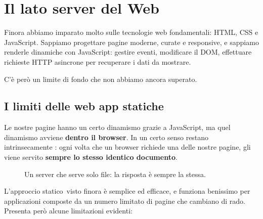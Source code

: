 \chapter{Il lato server del Web}

Finora abbiamo imparato molto sulle tecnologie web fondamentali: HTML, CSS e
JavaScript. Sappiamo progettare pagine moderne, curate e responsive, e sappiamo
renderle dinamiche con JavaScript: gestire eventi, modificare il DOM, effettuare
richieste HTTP asincrone per recuperare i dati da mostrare.

C'è però un limite di fondo che non abbiamo ancora superato.

\section{I limiti delle web app statiche}

Le nostre pagine hanno un certo dinamismo grazie a JavaScript, ma quel
dinamismo avviene \textbf{dentro il browser}. In un certo senso restano
intrinsecamente : ogni volta che un browser richiede una delle
nostre pagine, gli viene servito \textbf{sempre lo stesso identico documento}.

\begin{figure}[H]
  \centering
  \caption{Un server che serve solo file: la risposta è sempre la stessa.}
  \label{fig:static-server}
\end{figure}

L'approccio \guillemotleft statico\guillemotright\ visto finora è semplice ed efficace, e funziona
benissimo per applicazioni composte da un numero limitato di pagine che cambiano
di rado. Presenta però alcune limitazioni evidenti:

